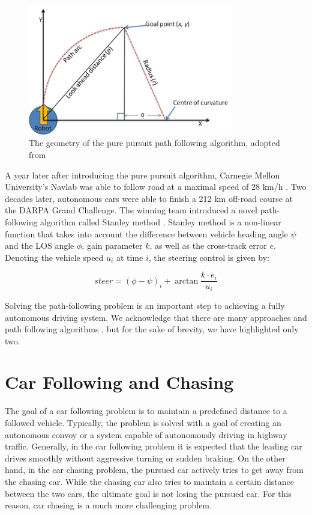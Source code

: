 \documentclass{ctuthesis/ctuthesis}
\begin{document}
\begin{figure}[]
    \centering
    \includegraphics[width=0.8\textwidth]{images/Geometry-of-the-pure-pursuit-algorithm.jpg}
    
    \caption{The geometry of the pure pursuit path following algorithm, adopted from \protect\cite{nice_picture}}\label{f:pure_pursuit}
\end{figure}


A year later after introducing the pure pursuit algorithm, Carnegie Mellon University's Navlab was able to follow road at a maximal speed of 28 km/h \cite{navlab1}. Two decades later, autonomous cars were able to finish a 212 km off-road course at the DARPA Grand Challenge. The winning team introduced a novel path-following algorithm called Stanley method \cite{stanley_method}. Stanley method is a non-linear function that takes into account the difference between vehicle heading angle $\psi$ and the LOS angle $\phi$, gain parameter $k$, as well as the cross-track error $e$. Denoting the vehicle speed $u_i$ at time $i$, the steering control is given by:

\begin{equation}
steer = (\phi- \psi)_i + \arctan{\dfrac{k\cdot e_i}{u_i}}
\end{equation}


Solving the path-following problem is an important step to achieving a fully autonomous driving system. We acknowledge that there are many approaches and path following algorithms \cite{path_following_overview}, but for the sake of brevity, we have highlighted only two.

\section{Car Following and Chasing}
The goal of a car following problem is to maintain a predefined distance to a followed vehicle. Typically, the problem is solved with a goal of creating an autonomous convoy or a system capable of autonomously driving in highway traffic. Generally, in the car following problem it is expected that the leading car drives smoothly without aggressive turning or sudden braking. On the other hand, in the car chasing problem, the pursued car actively tries to get away from the chasing car. While the chasing car also tries to maintain a certain distance between the two cars, the ultimate goal is not losing the pursued car. For this reason, car chasing is a much more challenging problem. \par
\end{document}
